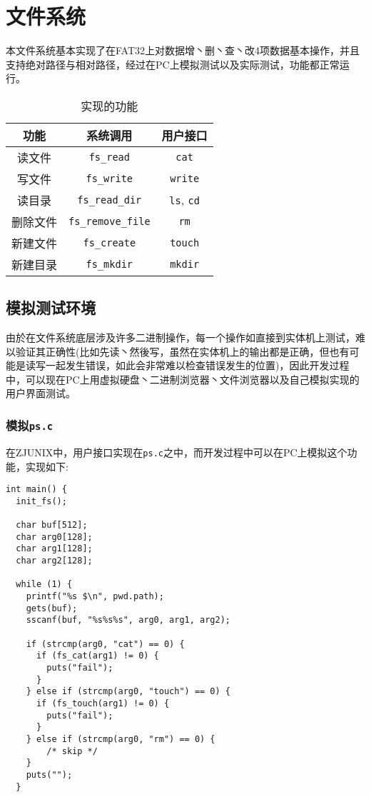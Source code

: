 \section{文件系统}


本文件系统基本实现了在FAT32上对数据增丶删丶查丶改4项数据基本操作，并且支持绝对路径与相对路径，经过在PC上模拟测试以及实际测试，功能都正常运行。




\begin{table}[H]
  \centering
  \caption{实现的功能}
  \begin{tabular}{|c|c|c|}
  \hline
  功能     & 系统调用 & 用户接口          \\
  \hline
  读文件   & \texttt{fs\_read} & \texttt{cat} \\
  \hline
  写文件   & \texttt{fs\_write} & \texttt{write} \\
  \hline
  读目录   & \texttt{fs\_read\_dir} & \texttt{ls}, \texttt{cd} \\
  \hline
  删除文件 & \texttt{fs\_remove\_file} & \texttt{rm} \\
  \hline
  新建文件 & \texttt{fs\_create} & \texttt{touch} \\
  \hline
  新建目录 & \texttt{fs\_mkdir} & \texttt{mkdir} \\
  \hline
  \end{tabular}
\end{table}



\subsection{模拟测试环境}



由於在文件系统底层涉及许多二进制操作，每一个操作如直接到实体机上测试，难以验证其正确性(比如先读丶然後写，虽然在实体机上的输出都是正确，但也有可能是读写一起发生错误，如此会非常难以检查错误发生的位置)，因此开发过程中，可以现在PC上用虚拟硬盘丶二进制浏览器丶文件浏览器以及自己模拟实现的用户界面测试。

\subsubsection{模拟\texttt{ps.c}}



在ZJUNIX中，用户接口实现在\texttt{ps.c}之中，而开发过程中可以在PC上模拟这个功能，实现如下:

\begin{lstlisting}[caption=FAT信息]
int main() {
  init_fs();

  char buf[512];
  char arg0[128];
  char arg1[128];
  char arg2[128];

  while (1) {
    printf("%s $\n", pwd.path);
    gets(buf);
    sscanf(buf, "%s%s%s", arg0, arg1, arg2);
    
    if (strcmp(arg0, "cat") == 0) {
      if (fs_cat(arg1) != 0) {
        puts("fail");
      }
    } else if (strcmp(arg0, "touch") == 0) {
      if (fs_touch(arg1) != 0) {
        puts("fail");
      }
    } else if (strcmp(arg0, "rm") == 0) {
        /* skip */
    }
    puts("");
  }
\end{lstlisting}




